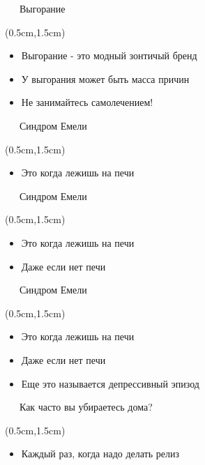 \documentclass[xetex,18pt,aspectratio=43]{beamer}
\begin{document}
\begin{Large}
\begin{frame}{\ \ \ Выгорание}
\begin{textblock*}{\framewidth-0.8cm}(0.5cm,1.5cm)
\begin{itemize}
  \item Выгорание - это модный зонтичый бренд
  \item У выгорания может быть масса причин
  \item Не занимайтесь самолечением!
\end{itemize}
\end{textblock*}
\end{frame}

\begin{frame}{\ \ \ Синдром Емели}
\begin{textblock*}{\framewidth-0.8cm}(0.5cm,1.5cm)
\begin{itemize}
  \item Это когда лежишь на печи
\end{itemize}
\end{textblock*}
\end{frame}

\begin{frame}{\ \ \ Синдром Емели}
\begin{textblock*}{\framewidth-0.8cm}(0.5cm,1.5cm)
\begin{itemize}
  \item Это когда лежишь на печи
  \item Даже если нет печи
\end{itemize}
\end{textblock*}
\end{frame}

\begin{frame}{\ \ \ Синдром Емели}
\begin{textblock*}{\framewidth-0.8cm}(0.5cm,1.5cm)
\begin{itemize}
  \item Это когда лежишь на печи
  \item Даже если нет печи
  \item Еще это называется депрессивный эпизод
\end{itemize}
\end{textblock*}
\end{frame}

\begin{frame}{\ \ \ Как часто вы убираетесь дома?}
\begin{textblock*}{\framewidth-0.8cm}(0.5cm,1.5cm)
\begin{itemize}
  \item Каждый раз, когда надо делать релиз
\end{itemize}
\end{textblock*}
\end{frame}


\end{Large}
\end{document}
